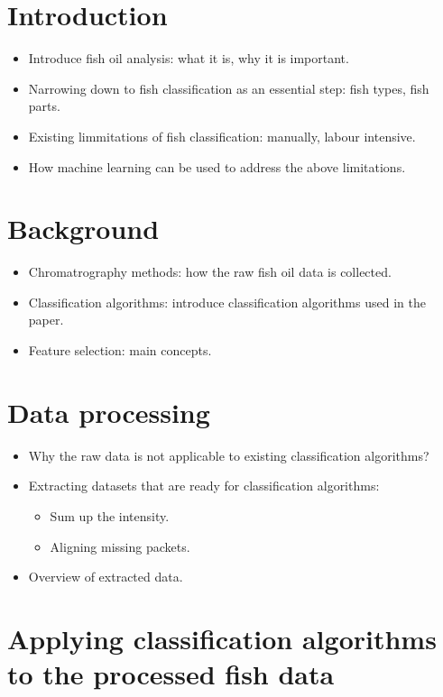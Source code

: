 \documentclass[runningheads]{llncs}
\begin{document}
\section{Introduction}

\begin{itemize}
    \item Introduce fish oil analysis: what it is, why it is important. 
    \item Narrowing down to fish classification as an essential step: fish types, fish parts. 
    \item Existing limmitations of fish classification: manually, labour intensive. 
    \item How machine learning can be used to address the above limitations. 
\end{itemize}

\section{Background}

\begin{itemize}
    \item Chromatrography methods: how the raw fish oil data is collected. 
    \item Classification algorithms: introduce classification algorithms used in the paper. 
    \item Feature selection: main concepts. 
\end{itemize}

\section{Data processing}

\begin{itemize}
    \item Why the raw data is not applicable to existing classification algorithms? 
    \item Extracting datasets that are ready for classification algorithms: 
    \begin{itemize}
        \item Sum up the intensity. 
        \item Aligning missing packets. 
    \end{itemize}
    \item Overview of extracted data.
\end{itemize}

\section{Applying classification algorithms to the processed fish data}
\end{document}
